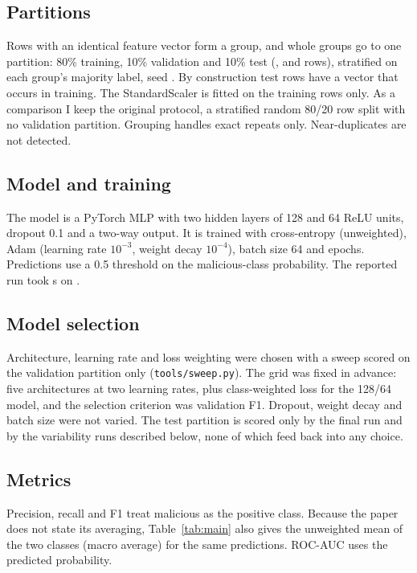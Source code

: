 \documentclass[conference]{IEEEtran}
\begin{document}
\subsection{Partitions}
Rows with an identical feature vector form a group, and whole groups go to one partition: 80\% training, 10\% validation and 10\% test (\NTrain, \NVal{} and \NTest{} rows), stratified on each group's majority label, seed \ConfigSeed. By construction \TestSeenInTrain{} test rows have a vector that occurs in training. The StandardScaler is fitted on the training rows only. As a comparison I keep the original protocol, a stratified random 80/20 row split with no validation partition. Grouping handles exact repeats only. Near-duplicates are not detected.

\subsection{Model and training}
The model is a PyTorch MLP with two hidden layers of 128 and 64 ReLU units, dropout 0.1 and a two-way output. It is trained with cross-entropy (unweighted), Adam (learning rate $10^{-3}$, weight decay $10^{-4}$), batch size 64 and \ConfigEpochs{} epochs. Predictions use a 0.5 threshold on the malicious-class probability. The reported run took \RunSeconds{} s on \RunDevice.

\subsection{Model selection}
Architecture, learning rate and loss weighting were chosen with a sweep scored on the validation partition only (\texttt{tools/sweep.py}). The grid was fixed in advance: five architectures at two learning rates, plus class-weighted loss for the 128/64 model, and the selection criterion was validation F1. Dropout, weight decay and batch size were not varied. The test partition is scored only by the final run and by the variability runs described below, none of which feed back into any choice.

\subsection{Metrics}
Precision, recall and F1 treat malicious as the positive class. Because the paper does not state its averaging, Table~\ref{tab:main} also gives the unweighted mean of the two classes (macro average) for the same predictions. ROC-AUC uses the predicted probability.
\end{document}
